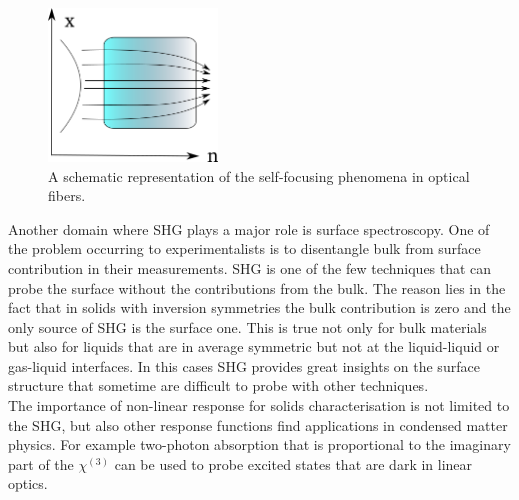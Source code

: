 \begin{figure}
 \vspace{-0.8cm}
\begin{center}
\includegraphics[width=0.4\textwidth]{Figures/selffocus}
\end{center}
\vspace{-0.5cm}
\caption{A schematic representation of the self-focusing phenomena in optical fibers. \label{selffocusing}}
\end{figure}           
Another domain where SHG plays a major role is surface spectroscopy. One of the problem occurring to experimentalists is to disentangle bulk from surface contribution in their measurements. SHG is one of the few techniques that can probe the surface without the contributions from the bulk. The reason lies in the fact that in solids with inversion symmetries the bulk contribution is zero and the only source of SHG is the surface one. This is true not only for bulk materials but also for liquids that are in average symmetric but not at the liquid-liquid or gas-liquid interfaces. In  this cases SHG provides  great insights on the surface structure that sometime are difficult to probe with other techniques.\cite{eisenthal1996liquid} \\ 
The importance of non-linear response for solids characterisation is not limited to the SHG, but also other response functions find applications in condensed matter physics. For example two-photon absorption that is proportional to the imaginary part of the $\chi^{(3)}$ can be used to probe excited states that are dark in linear optics.\cite{wang2005optical,cassabois2015hexagonal}\\ 
